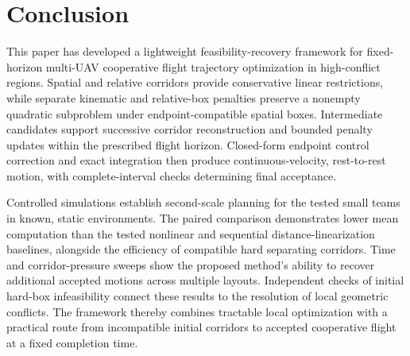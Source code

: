 \section{Conclusion}
This paper has developed a lightweight feasibility-recovery framework for fixed-horizon multi-UAV cooperative flight trajectory optimization in high-conflict regions. Spatial and relative corridors provide conservative linear restrictions, while separate kinematic and relative-box penalties preserve a nonempty quadratic subproblem under endpoint-compatible spatial boxes. Intermediate candidates support successive corridor reconstruction and bounded penalty updates within the prescribed flight horizon. Closed-form endpoint control correction and exact integration then produce continuous-velocity, rest-to-rest motion, with complete-interval checks determining final acceptance.

Controlled simulations establish second-scale planning for the tested small teams in known, static environments. The paired comparison demonstrates lower mean computation than the tested nonlinear and sequential distance-linearization baselines, alongside the efficiency of compatible hard separating corridors. Time and corridor-pressure sweeps show the proposed method's ability to recover additional accepted motions across multiple layouts. Independent checks of initial hard-box infeasibility connect these results to the resolution of local geometric conflicts. The framework thereby combines tractable local optimization with a practical route from incompatible initial corridors to accepted cooperative flight at a fixed completion time.
